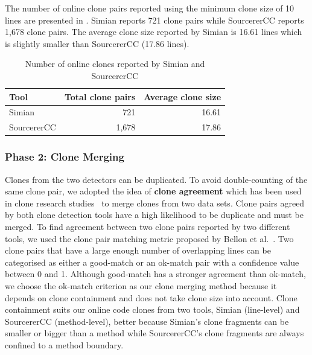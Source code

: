 \documentclass[10pt,journal,compsoc]{IEEEtran}
\begin{document}
%
The number of online clone pairs reported using the minimum clone size of 10 lines
are presented in . Simian reports 721 clone
pairs while SourcererCC reports 1,678 clone pairs. 
The average clone size reported by Simian is
16.61 lines which is slightly smaller than SourcererCC (17.86 lines).

\begin{table}
	\centering
	\caption{Number of online clones reported by Simian and SourcererCC}
	\label{tab:orig_stats}
	\begin{tabular}{lrr}
		\toprule
		Tool & \multicolumn{1}{c}{Total clone pairs} & \multicolumn{1}{c}{Average clone size} \\
		\midrule
		Simian & 721 & 16.61 \\
		SourcererCC & 1,678 & 17.86 \\
		\bottomrule
	\end{tabular} %
\end{table}

\subsubsection{Phase 2: Clone Merging} Clones from the two detectors can be
duplicated. To avoid double-counting of the same clone pair, we adopted the idea
of \textbf{clone agreement} which has been used in clone research
studies~\cite{Funaro2010, Wang2013,cr2016ssbse} to merge clones from two data
sets. Clone pairs agreed by both clone detection tools have a high
likelihood to be duplicate and must be merged. 
To find agreement between two clone
pairs reported by two different tools, we used the clone pair matching metric
proposed by Bellon et al.~\cite{Bellon2007}. Two clone pairs that have a large
enough number of overlapping lines can be categorised as either a good-match or
an ok-match pair with a
confidence value between 0 and 1. Although good-match has a stronger agreement
than ok-match, we choose the ok-match criterion as our clone merging method
because it depends on clone containment and does
not take clone size into account. Clone containment suits our online code clones
from two tools, Simian (line-level) and SourcererCC (method-level), better
because Simian's clone fragments can be smaller or bigger than a method
while SourcererCC's clone fragments are always confined to a method boundary.
\end{document}

